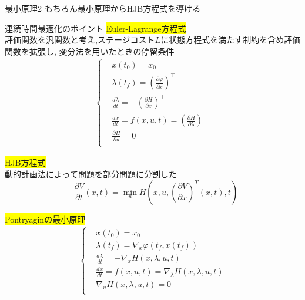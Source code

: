\documentclass[twocolumn, dvipdfmx,12pt]{beamer}
\begin{document}
    \begin{frame}{最小原理2}
        \footnotesize
        もちろん最小原理からHJB方程式を導ける

    \end{frame}

    \begin{frame}{連続時間最適化のポイント}
        \tiny
        \colorbox{yellow}{Euler-Lagrange方程式} \\
        \qquad 評価関数を汎関数と考え,ステージコスト$L$に状態方程式を満たす制約を含め評価関数を拡張し,
        変分法を用いたときの停留条件
        \begin{align*}
            \begin{cases}
                &x(t_0)=x_0 \\
                &\lambda(t_f)=\left(\frac{\partial \varphi}{\partial x}\right)^\top \\
                &\frac{d\lambda}{dt}=-\left(\frac{\partial H}{\partial x}\right)^\top\\
                &\frac{dx}{dt}=f(x,u,t)=\left(\frac{\partial H}{\partial \lambda}\right)^\top \\
                &\frac{\partial H}{\partial u}=0 \\
            \end{cases}
        \end{align*}

        \colorbox{yellow}{HJB方程式} \\
        \qquad 動的計画法によって問題を部分問題に分割した
        \begin{equation*}
            -\frac{\partial V}{\partial t}\left(x,t\right) = \min _u H\left(x, u, \left( \frac{\partial V}{\partial x} \right)^T\left(x, t\right), t \right)
        \end{equation*}

        \colorbox{yellow}{Pontryaginの最小原理} \\
        \begin{align*}
            \begin{cases}
                &x(t_0)=x_0 \\
                &\lambda(t_f)=\nabla_x \varphi(t_f, x(t_f)) \\
                &\frac{d\lambda}{dt}=-\nabla_x H(x, \lambda, u, t)\\
                &\frac{dx}{dt}=f(x,u,t)=\nabla_\lambda H(x, \lambda, u, t) \\
                &\nabla_u H(x, \lambda, u, t)=0 \\
            \end{cases}  
        \end{align*}
    \end{frame}
\end{document}
